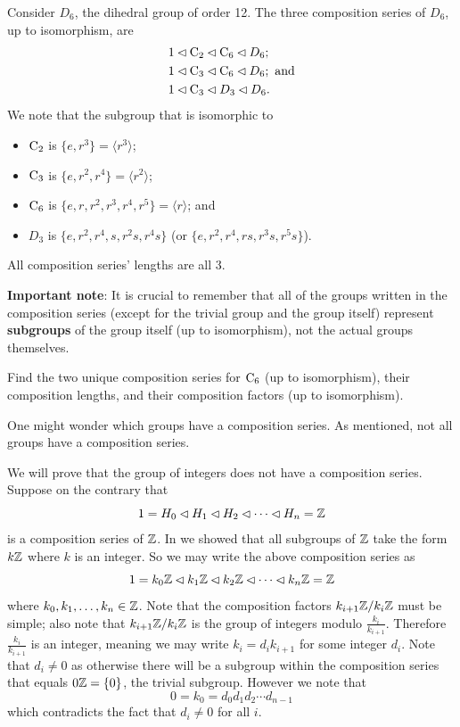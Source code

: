 \begin{example}
    Consider $D_6$, the dihedral group of order 12. The three composition series of $D_6$, up to isomorphism, are
    \begin{align*}
        &1 \lhd \mathrm{C}_{2} \lhd \mathrm{C}_{6} \lhd D_6;\\
        &1 \lhd \mathrm{C}_{3} \lhd \mathrm{C}_{6} \lhd D_6; \text{ and}\\
        &1 \lhd \mathrm{C}_{3} \lhd D_3 \lhd D_6.
    \end{align*}
    We note that the subgroup that is isomorphic to
    \begin{itemize}
        \item $\mathrm{C}_{2}$ is $\{e, r^3\} = \langle r^3 \rangle$;
        \item $\mathrm{C}_{3}$ is $\{e, r^2, r^4\} = \langle r^2\rangle$;
        \item $\mathrm{C}_{6}$ is $\{e, r, r^2, r^3, r^4, r^5\} = \langle r\rangle$; and
        \item $D_3$ is $\{e, r^2, r^4, s, r^2s, r^4s\}$ (or $\{e, r^2, r^4, rs, r^3s, r^5s\}$).
    \end{itemize}
    All composition series' lengths are all 3.
\end{example}

\textbf{Important note}: It is crucial to remember that all of the groups written in the composition series (except for the trivial group and the group itself) represent \textbf{subgroups} of the group itself (up to isomorphism), not the actual groups themselves.

\begin{exercise}
    Find the two unique composition series for $\mathrm{C}_{6}$ (up to isomorphism), their composition lengths, and their composition factors (up to isomorphism).
\end{exercise}

One might wonder which groups have a composition series. As mentioned, not all groups have a composition series.

\begin{example}
    We will prove that the group of integers does not have a composition series. Suppose on the contrary that
    \[
        1 = H_0 \lhd H_1 \lhd H_2 \lhd \cdots \lhd H_n = \mathbb{Z}
    \]
    is a composition series of $\mathbb{Z}$. In  we showed that all subgroups of $\mathbb{Z}$ take the form $k\mathbb{Z}$ where $k$ is an integer. So we may write the above composition series as
    \[
        1 = k_0\mathbb{Z} \lhd k_1\mathbb{Z} \lhd k_2\mathbb{Z} \lhd \cdots \lhd k_n\mathbb{Z} = \mathbb{Z}
    \]
    where $k_0, k_1, \dots, k_n \in \mathbb{Z}$. Note that the composition factors $k_{i+1}\mathbb{Z}/k_i\mathbb{Z}$ must be simple; also note that $k_{i+1}\mathbb{Z}/k_i\mathbb{Z}$ is the group of integers modulo $\frac{k_i}{k_{i+1}}$. Therefore $\frac{k_i}{k_{i+1}}$ is an integer, meaning we may write $k_i = d_ik_{i+1}$ for some integer $d_i$. Note that $d_i \neq 0$ as otherwise there will be a subgroup within the composition series that equals $0\mathbb{Z} = \{0\}$, the trivial subgroup. However we note that
    \[
        0 = k_0 = d_0d_1d_2\cdots d_{n-1}
    \]
    which contradicts the fact that $d_i \neq 0$ for all $i$.
\end{example}

